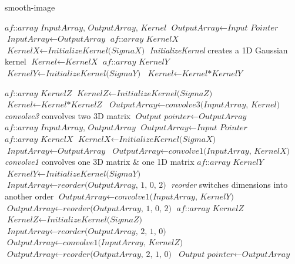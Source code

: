 \documentclass[10pt]{report}
\begin{document}
	\begin{algorithm}[H]
		\caption{smooth-image}\label{smooth-image}
		\begin{algorithmic}[1]
				\State $\textit{af::array InputArray, OutputArray, Kernel}$
				\State $\textit{OutputArray} \gets \textit{Input Pointer}$
				\State $\textit{InputArray} \gets \textit{OutputArray}$
					\State $\textit{af::array KernelX}$	
					\State $\textit{KernelX} \gets \textit{InitializeKernel(SigmaX)}$ \Comment  \textit{InitializeKernel} creates a 1D Gaussian kernel
					\State $\textit{Kernel} \gets \textit{KernelX}$
				\EndIf
					\State $\textit{af::array KernelY}$	
					\State $\textit{KernelY} \gets \textit{InitializeKernel(SigmaY)}$
					\State $\textit{Kernel} \gets \textit{Kernel*KernelY}$

				\EndIf
					\State $\textit{af::array KernelZ}$	
					\State $\textit{KernelZ} \gets \textit{InitializeKernel(SigmaZ)}$
					\State $\textit{Kernel} \gets \textit{Kernel*KernelZ}$
				\EndIf
				\State $\textit{OutputArray} \gets \textit{convolve3(InputArray, Kernel)}$ \Comment  \textit{convolve3} convolves two 3D matrix 
				\State $\textit{Output pointer} \gets \textit{OutputArray}$
			\EndProcedure
			\State $ $
				\State $\textit{af::array InputArray, OutputArray}$
				\State $\textit{OutputArray} \gets \textit{Input Pointer}$
					\State $\textit{af::array KernelX}$	
					\State $\textit{KernelX} \gets \textit{InitializeKernel(SigmaX)}$ 
					\State $\textit{InputArray} \gets \textit{OutputArray}$
					\State $\textit{OutputArray} \gets \textit{convolve1(InputArray, KernelX)}$ \Comment \textit{convolve1} convolves one 3D matrix  \& one 1D matrix 
				\EndIf
					\State $\textit{af::array KernelY}$	
					\State $\textit{KernelY} \gets \textit{InitializeKernel(SigmaY)}$
					\State $\textit{InputArray} \gets \textit{reorder(OutputArray, 1, 0, 2)}$ \Comment \textit{reorder} switches dimensions into another order
					\State $\textit{OutputArray} \gets \textit{convolve1(InputArray, KernelY)}$
					\State $\textit{OutputArray} \gets \textit{reorder(OutputArray, 1, 0, 2)}$
				\EndIf
					\State $\textit{af::array KernelZ}$	
					\State $\textit{KernelZ} \gets \textit{InitializeKernel(SigmaZ)}$
					\State $\textit{InputArray} \gets \textit{reorder(OutputArray, 2, 1, 0)}$
					\State $\textit{OutputArray} \gets \textit{convolve1(InputArray, KernelZ)}$
					\State $\textit{OutputArray} \gets \textit{reorder(OutputArray, 2, 1, 0)}$
				\EndIf
				\State $\textit{Output pointer} \gets \textit{OutputArray}$
			\EndProcedure


\end{algorithmic}
\end{algorithm}
\end{document}
